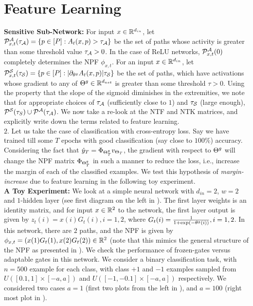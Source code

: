\section{Feature Learning}
\textbf{Sensitive Sub-Network:} For input $x\in\R^{d_{in}}$, let $\P^{\A}_{x,t}(\tau_{\A})=\{p\in[P]:A_t(x,p)>\tau_{\A}\}$ be the set of paths whose activity is greater than some threshold value $\tau_{\A}>0$. In the case of ReLU networks, $\P^{\A}_{x,t}(0)$ completely determines the NPF $\phi_{x,t}$. For an input $x\in\R^{d_{in}}$, let $\P^{\S}_{x,t}(\tau_{\S})=\{p\in[P]: |\partial_{\tg} A_t(x,p)|\tau_{\S}\}$ be the set of paths, which have activations whose gradient to any of $\Tg\inrdnet$ is greater than some threshold $\tau>0$. Using the property that the slope of the sigmoid diminishes in the extremities, we note that for appropriate choices of $\tau_{\A}$ (sufficiently close to $1$) and $\tau_{\S}$ (large enough), $\P^{\S}(\tau_{S})\cup \P^{\A}(\tau_{\A})$.
We now take a re-look at the NTF and NTK matrices, and explicitly write down the terms related to feature learning. \hfill\\
$2.$ Let us take the case of classification with cross-entropy loss. Say we have trained till some $T$ epochs with good classification (say close to $100\%$) accuracy. Considering the fact that $\hat{y}_T=\Phi_{\Tg_T}v_{\Theta_T}$, the gradient with respect to $\Tg$ will change the NPF matrix $\Phi_{\Tg_T}$ in such a manner to reduce the loss, i.e., increase the margin of each of the classified examples. We test this hypothesis  of \emph{margin-increase} due to feature learning in the following toy experiment.\hfill\\
\textbf{A Toy Experiment:} We look at a simple neural network with $d_{in}=2$, $w=2$ and $1$-hidden layer (see first diagram on the left in ). The first layer weights is an identity matrix, and for input $x\in\R^2$ to the network, the first layer output is given by $z_{t}(i)=x(i)G_t(i),i=1,2$, where $G_t(i)=\frac{1}{1+\exp(-\tg(i))},i=1,2$. In this network, there are $2$ paths, and the NPF is given by $\phi_{x,t}=(x(1)G_t(1),x(2)G_t(2))\in \R^2$ (note that this mimics the general structure of the NPF as presented in ).
We check the performance of frozen-gates versus adaptable gates in this network. We consider a binary classification task, with $n=500$ example for each class, with class $+1$ and $-1$ examples sampled from $U([0.1,1]\times [-a,a])$ and $U([-1,-0.1]\times[-a,a])$ respectively. We considered two cases $a=1$ (first two plots from the left in ), and $a=100$ (right most plot in ). 
